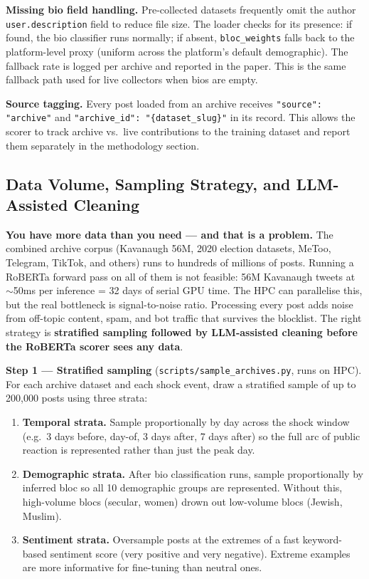 \documentclass[11pt]{article}
\begin{document}
\medskip
\noindent\textbf{Missing bio field handling.} Pre-collected datasets frequently
omit the author \texttt{user.description} field to reduce file size. The loader
checks for its presence: if found, the bio classifier runs normally; if absent,
\texttt{bloc\_weights} falls back to the platform-level proxy (uniform across
the platform's default demographic). The fallback rate is logged per archive
and reported in the paper. This is the same fallback path used for live
collectors when bios are empty.

\medskip
\noindent\textbf{Source tagging.} Every post loaded from an archive receives
\texttt{"source": "archive"} and \texttt{"archive\_id": "\{dataset\_slug\}"} in
its record. This allows the scorer to track archive vs.\ live contributions to
the training dataset and report them separately in the methodology section.

\subsection*{Data Volume, Sampling Strategy, and LLM-Assisted Cleaning}

\textbf{You have more data than you need --- and that is a problem.}
The combined archive corpus (Kavanaugh 56M, 2020 election datasets, MeToo,
Telegram, TikTok, and others) runs to hundreds of millions of posts. Running a
RoBERTa forward pass on all of them is not feasible: 56M Kavanaugh tweets at
$\sim$50ms per inference = 32 days of serial GPU time. The HPC can parallelise
this, but the real bottleneck is signal-to-noise ratio. Processing every post
adds noise from off-topic content, spam, and bot traffic that survives the
blocklist. The right strategy is \textbf{stratified sampling followed by
LLM-assisted cleaning before the RoBERTa scorer sees any data}.

\medskip
\noindent\textbf{Step 1 --- Stratified sampling} (\texttt{scripts/sample\_archives.py},
runs on HPC). For each archive dataset and each shock event, draw a stratified
sample of up to 200,000 posts using three strata:

\begin{enumerate}[leftmargin=2em, itemsep=2pt]
  \item \textbf{Temporal strata.} Sample proportionally by day across the
        shock window (e.g.\ 3 days before, day-of, 3 days after, 7 days after)
        so the full arc of public reaction is represented rather than just the
        peak day.
  \item \textbf{Demographic strata.} After bio classification runs, sample
        proportionally by inferred bloc so all 10 demographic groups are
        represented. Without this, high-volume blocs (secular, women)
        drown out low-volume blocs (Jewish, Muslim).
  \item \textbf{Sentiment strata.} Oversample posts at the extremes of a
        fast keyword-based sentiment score (very positive and very negative).
        Extreme examples are more informative for fine-tuning than neutral ones.
\end{enumerate}
\end{document}
